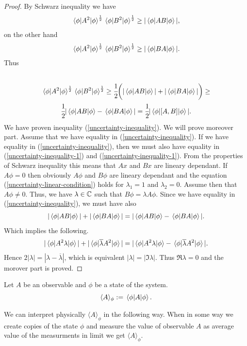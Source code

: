 \documentclass[main.tex]{subfiles}
\begin{document}
\begin{proof}
By Schwarz inequality we have
\begin{equation}
\label{uncertainty-inequality-1}
\mel{\phi}{A^2}{\phi}^{\frac{1}{2}} \mel{\phi}{B^2}{\phi}^{\frac{1}{2}} \geq |\mel{\phi}{AB}{\phi}|,
\end{equation}
on the other hand
\begin{equation}
\label{uncertainty-inequality-2}
\mel{\phi}{A^2}{\phi}^{\frac{1}{2}} \mel{\phi}{B^2}{\phi}^{\frac{1}{2}} \geq |\mel{\phi}{BA}{\phi}|.
\end{equation}
Thus
\begin{multline}
\\
\mel{\phi}{A^2}{\phi}^{\frac{1}{2}} \mel{\phi}{B^2}{\phi}^{\frac{1}{2}} \geq
\cfrac{1}{2}\bigg(|\mel{\phi}{AB}{\phi}| + |\mel{\phi}{BA}{\phi}|\bigg) \geq \\
\cfrac{1}{2}|\mel{\phi}{AB}{\phi} - \mel{\phi}{BA}{\phi}| = 
\cfrac{1}{2}|\mel{\phi}{[A,B]}{\phi}|.
\end{multline}
We have proven inequality (\ref{uncertainty-inequality}). We will prove moreover part.
Assume that we have equality in (\ref{uncertainty-inequality}).  If we have equality in (\ref{uncertainty-inequality}), then we must also have equality in (\ref{uncertainty-inequality-1}) and (\ref{uncertainty-inequality-1}). From the properties of Schwarz inequality this means that $Ax$ and $Bx$ are lineary dependant. If $A\phi = 0$ then obviously $A\phi$ and $B\phi$ are lineary dependant and the equation (\ref{uncertainty-linear-condition}) holds for $\lambda_1=1$ and $\lambda_2 = 0$. Assume then that $A\phi \not= 0$. Thus, we have $\lambda\in \mathbb{C}$ such that $B\phi = \lambda A\phi$.
Since we have equality in (\ref{uncertainty-inequality}), we must have also
\begin{equation}
|\mel{\phi}{AB}{\phi}| + |\mel{\phi}{BA}{\phi}| = |\mel{\phi}{AB}{\phi} - \mel{\phi}{BA}{\phi}|.
\end{equation}
Which implies the following.
\begin{equation}
|\mel{\phi}{A^2 \lambda}{\phi}| + |\mel{\phi}{\overline{\lambda} A^2}{\phi}| = |\mel{\phi}{A^2 \lambda}{\phi} - \mel{\phi}{\overline{\lambda} A^2}{\phi}|.
\end{equation}
Hence $2|\lambda|=|\lambda - \overline{\lambda}|$, which is equivalent $|\lambda| = |\Im \lambda |$. Thus $\Re\lambda = 0$ and the morover part is proved.
\end{proof}

\begin{definition}
Let $A$ be an observable and $\phi$ be a state of the system.
\begin{equation}
\langle A \rangle_\phi := \mel{\phi}{A}{\phi}.
\end{equation}
\end{definition}
We can interpret physically $\langle A \rangle_\phi$ in the following way. When in some way we create copies of the state $\phi$ and measure the value of observable $A$ as average value of the measurments in limit we get $\langle A \rangle_\phi$.
\end{document}
